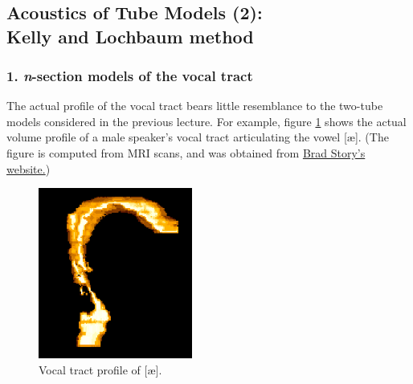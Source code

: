
\chapter*{}
\section*{\LARGE Acoustics of Tube Models (2):\\ Kelly and Lochbaum method}


\label{atm}

\subsection*{1. \textit{n}-section models of the vocal tract}

The actual profile of the vocal tract bears little resemblance to the two-tube models considered in the previous lecture. For example, figure \ref{f1} shows the actual volume profile of a male speaker's vocal tract articulating the vowel {[}\ae {]}. (The figure is computed from MRI scans, and was obtained from \href{https://slhs.arizona.edu/person/brad-story-phd}{Brad Story's website.})

\captionsetup[figure]{list=no}
\setcounter{figure}{0}
\makeatletter 
\renewcommand{\thefigure}{\@arabic\c@figure}
\makeatother

\begin{figure}[htbp]
\begin{center}
\includegraphics[width=0.45\textwidth]{mp/img/male-ae.png}
\caption{Vocal tract profile of {[}\ae {]}.}
\label{f1}
\end{center}
\end{figure}

